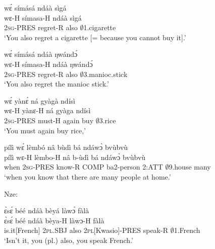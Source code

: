 \begin{exe} 
\exC\label{236} 
  \glll wɛ́ símásá ndáà sìgá \\
        wɛ-H símasa-H ndáà sìgá \\
        2\textsc{sg}-PRES regret-R also $\emptyset$1.cigarette \\
    \trans `You also regret a cigarette [= because you cannot buy it].'
\end{exe}

\begin{exe} 
\exC\label{237}
  \glll  wɛ́ símásá ndáà ŋwándɔ́ \\
       wɛ-H símasa-H ndáà ŋwándɔ́ \\
       2\textsc{sg}-PRES regret-R also $\emptyset$3.manioc.stick   \\
    \trans `You also regret the manioc stick.'
\end{exe}

\begin{exe} 
\exC\label{238} 
  \glll  wɛ́ yànɛ́ ná gyàgà ndísì \\
     wɛ-H yànɛ-H ná gyàga ndísì \\
        2\textsc{sg}-PRES must-H again buy $\emptyset$3.rice  \\
    \trans `You must again buy rice,'
\end{exe}

\begin{exe} 
\exC\label{239} 
  \glll pílì wɛ́ lèmbó nâ bùdì bá ndáwɔ̀ bvùbvù \\
      pílì wɛ-H lèmbo-H nâ b-ùdì bá ndáwɔ̀ bvùbvù \\
        when 2\textsc{sg}-PRES know-R COMP ba2-person 2:ATT $\emptyset$9.house many  \\
    \trans `when you know that there are many people at home.'
\end{exe}

\noindent Nze:

\begin{exe} 
\exC\label{240} 
  \glll  ɛ̀sɛ́ béé ndáà bèyá làwɔ́ fàlà \\
       ɛ̀sɛ́ béé ndáà bèya-H làwɔ-H fàlà \\
        is.it[French] 2\textsc{pl}.SBJ also 2\textsc{pl}[Kwasio]-PRES speak-R $\emptyset$1.French  \\
    \trans `Isn't it, you (pl.) also, you speak French.'
\end{exe}

